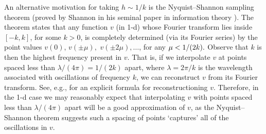 An alternative motivation for taking $h \sim 1/k$ is the Nyquist--Shannon sampling theorem (proved by Shannon in his seminal paper in information theory \cite[Theorem 1]{Sh:49}). The theorem states that any function $v$ (in 1-d) whose Fourier transform lies inside $[-k,k]$, for some $k>0$, is completely determined (via its Fourier series) by the point values $v(0)$, $v(\pm \mu),$ $v(\pm2\mu),  \ldots$, for any $\mu < 1/\mleft(2k\mright).$ Observe that $k$ is then the highest frequency present in $v$.  That is, if we interpolate $v$ at points spaced less than $ \lambda/(4\pi)=1/(2k)$ apart, where $\lambda = 2\pi/k$ is the wavelength associated with oscillations of frequency $k$, we can reconstruct $v$ from its Fourier transform. See, e.g., \cite[\S 5.21]{BaNaBe:00} for an explicit formula for reconstructioning $v$. Therefore, in the 1-d case we may reasonably expect that interpolating $v$ with points spaced less than $\lambda/(4\pi)$ apart will be a good approximation of $v$, as the Nyquist--Shannon theorem suggests such a spacing of points `captures' all of the oscillations in $v.$


